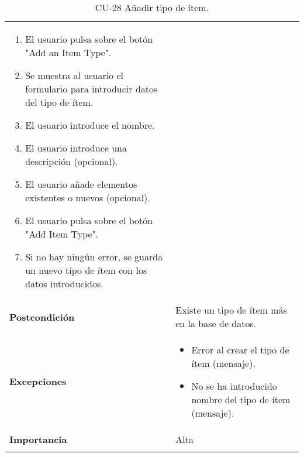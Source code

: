\begin{longtable}[]{@{}ll@{}}
\begin{minipage}[t]{0.73\columnwidth}
\begin{enumerate}
\tightlist
\item
  El usuario pulsa sobre el botón "Add an Item Type".
\item
  Se muestra al usuario el formulario para introducir datos del tipo de
  ítem.
\item
  El usuario introduce el nombre.
\item
  El usuario introduce una descripción (opcional).
\item
  El usuario añade elementos existentes o nuevos (opcional).
\item
  El usuario pulsa sobre el botón "Add Item Type".
\item
  Si no hay ningún error, se guarda un nuevo tipo de ítem con los datos
  introducidos.
\end{enumerate}\strut
\end{minipage}\tabularnewline
\begin{minipage}[t]{0.21\columnwidth}\raggedright
\textbf{Postcondición}\strut
\end{minipage} & \begin{minipage}[t]{0.73\columnwidth}\raggedright
Existe un tipo de ítem más en la base de datos.\strut
\end{minipage}\tabularnewline
\begin{minipage}[t]{0.21\columnwidth}\raggedright
\textbf{Excepciones}\strut
\end{minipage} & \begin{minipage}[t]{0.73\columnwidth}\raggedright
\begin{itemize}
\tightlist
\item
  Error al crear el tipo de ítem (mensaje).
\item
  No se ha introducido nombre del tipo de ítem (mensaje).
\end{itemize}\strut
\end{minipage}\tabularnewline
\begin{minipage}[t]{0.21\columnwidth}\raggedright
\textbf{Importancia}\strut
\end{minipage} & \begin{minipage}[t]{0.73\columnwidth}\raggedright
Alta\strut
\end{minipage}\tabularnewline
\bottomrule
\caption{CU-28 Añadir tipo de ítem.}
\end{longtable}

